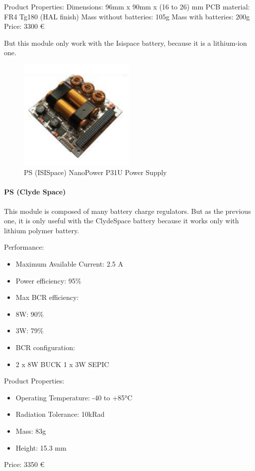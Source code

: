Product Properties:
Dimensions: 96mm x 90mm x (16 to 26) mm
PCB material: FR4 Tg180 (HAL finish)
Mass without batteries: 105g
Mass with batteries: 200g
Price: 3300 \euro

But this module only work with the Isispace battery, because it is a lithium-ion one.

\begin{figure}[h]
	\centering
	\includegraphics[width=0.5\textwidth]{img/PS_isispace.png}
	\caption{PS (ISISpace) NanoPower P31U Power Supply}
	\label{fig:PS_isispace}
\end{figure}


\paragraph{PS (Clyde Space)}

This module is composed of many battery charge regulators. But as the previous one,
it is only useful with the ClydeSpace battery because it works only with lithium polymer battery.

Performance:

\begin{itemize}
	\item Maximum Available Current: 2.5 A
	\item Power efficiency: 95\%
	\item Max BCR efficiency:
	\item 8W: 90\%
	\item 3W: 79\%
	\item BCR configuration:
	\item 2 x 8W BUCK 1 x 3W SEPIC
\end{itemize}

Product Properties:

\begin{itemize}
	\item Operating Temperature: -40 to +85°C
	\item Radiation Tolerance: 10kRad
	\item Mass: 83g
	\item Height: 15.3 mm
\end{itemize}
Price: 3350 \euro




